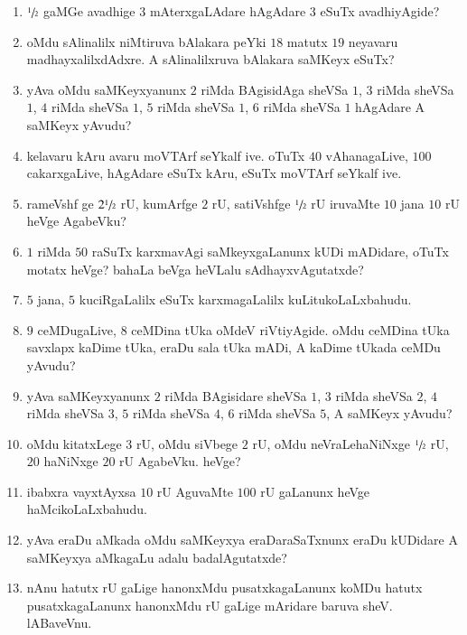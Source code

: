 \begin{enumerate}
\item $\sfrac{1}{2}$ gaMGe avadhige $3$ mAterxgaLAdare hAgAdare $3$ eSuTx avadhiyAgide?

\item oMdu sAlinalilx niMtiruva bAlakara peYki $18$ matutx $19$ neyavaru madhayxalilxdAdxre. A sAlinalilxruva bAlakara saMKeyx eSuTx?

\item yAva oMdu saMKeyxyanunx $2$ riMda BAgisidAga sheVSa $1$, $3$ riMda sheVSa $1$, $4$ riMda sheVSa $1$, $5$ riMda sheVSa $1$, $6$ riMda sheVSa $1$ hAgAdare A saMKeyx yAvudu?

\item kelavaru kAru avaru moVTArf seYkalf ive. oTuTx $40$ vAhanagaLive, $100$ cakarxgaLive, hAgAdare eSuTx kAru, eSuTx moVTArf seYkalf ive.

\item rameVshf ge $2\sfrac{1}{2}$ rU, kumArfge $2$ rU, satiVshfge $\sfrac{1}{2}$ rU iruvaMte $10$ jana $10$ rU heVge AgabeVku?

\item $1$ riMda $50$ raSuTx karxmavAgi saMkeyxgaLanunx kUDi mADidare, oTuTx motatx heVge? bahaLa beVga heVLalu sAdhayxvAgutatxde?

\item $5$ jana, $5$ kuciRgaLalilx eSuTx karxmagaLalilx kuLitukoLaLxbahudu.

\item $9$ ceMDugaLive, $8$ ceMDina tUka oMdeV riVtiyAgide. oMdu ceMDina tUka savxlapx kaDime tUka, eraDu sala tUka mADi, A kaDime tUkada ceMDu yAvudu?

\item yAva saMKeyxyanunx $2$ riMda BAgisidare sheVSa $1$, $3$ riMda sheVSa $2$, $4$ riMda sheVSa $3$, $5$ riMda sheVSa $4$, $6$ riMda sheVSa $5$, A saMKeyx yAvudu?

\item oMdu kitatxLege $3$ rU, oMdu siVbege $2$ rU, oMdu neVraLehaNiNxge $\sfrac{1}{2}$ rU, $20$ haNiNxge $20$ rU AgabeVku. heVge?

\item ibabxra vayxtAyxsa $10$ rU AguvaMte $100$ rU gaLanunx heVge haMcikoLaLxbahudu.

\item yAva eraDu aMkada oMdu saMKeyxya eraDaraSaTxnunx eraDu kUDidare A saMKeyxya aMkagaLu adalu badalAgutatxde?

\item nAnu hatutx rU gaLige hanonxMdu pusatxkagaLanunx koMDu hatutx pusatxkagaLanunx hanonxMdu rU gaLige mAridare baruva sheV. lABaveVnu.


\end{enumerate}
